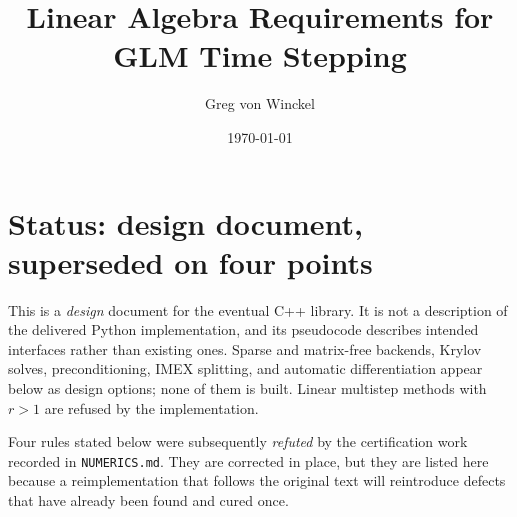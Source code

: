\documentclass[11pt]{article}
\begin{document}
\title{Linear Algebra Requirements for GLM Time Stepping}
\date{\today}
\author{Greg von Winckel}
\maketitle

\section*{Status: design document, superseded on four points}

This is a \emph{design} document for the eventual C++ library. It is not a
description of the delivered Python implementation, and its pseudocode
describes intended interfaces rather than existing ones. Sparse and
matrix-free backends, Krylov solves, preconditioning, IMEX splitting, and
automatic differentiation appear below as design options; none of them is
built. Linear multistep methods with $r>1$ are refused by the implementation.

Four rules stated below were subsequently \emph{refuted} by the certification
work recorded in \texttt{NUMERICS.md}. They are corrected in place, but they
are listed here because a reimplementation that follows the original text will
reintroduce defects that have already been found and cured once.
\end{document}
